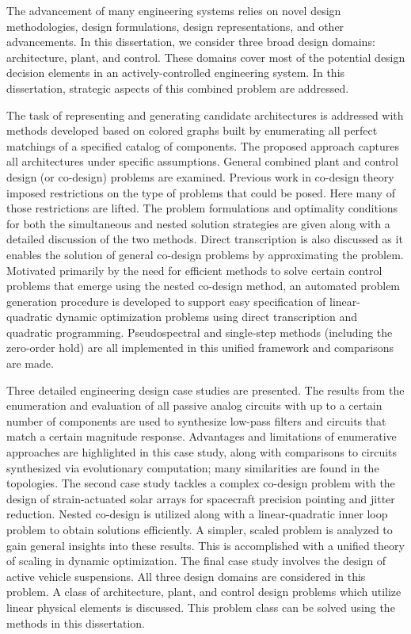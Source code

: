 The advancement of many engineering systems relies on novel design methodologies, design formulations, design representations, and other advancements. In this dissertation, we consider three broad design domains: architecture, plant, and control. These domains cover most of the potential design decision elements in an actively-controlled engineering system. In this dissertation, strategic aspects of this combined problem are addressed.

The task of representing and generating candidate architectures is addressed with methods developed based on colored graphs built by enumerating all perfect matchings of a specified catalog of components. The proposed approach captures all architectures under specific assumptions. General combined plant and control design (or co-design) problems are examined. Previous work in co-design theory imposed restrictions on the type of problems that could be posed. Here many of those restrictions are lifted. The problem formulations and optimality conditions for both the simultaneous and nested solution strategies are given along with a detailed discussion of the two methods. Direct transcription is also discussed as it enables the solution of general co-design problems by approximating the problem. Motivated primarily by the need for efficient methods to solve certain control problems that emerge using the nested co-design method, an automated problem generation procedure is developed to support easy specification of linear-quadratic dynamic optimization problems using direct transcription and quadratic programming. Pseudospectral and single-step methods (including the zero-order hold) are all implemented in this unified framework and comparisons are made.

Three detailed engineering design case studies are presented. The results from the enumeration and evaluation of all passive analog circuits with up to a certain number of components are used to synthesize low-pass filters and circuits that match a certain magnitude response. Advantages and limitations of enumerative approaches are highlighted in this case study, along with comparisons to circuits synthesized via evolutionary computation; many similarities are found in the topologies. The second case study tackles a complex co-design problem with the design of strain-actuated solar arrays for spacecraft precision pointing and jitter reduction. Nested co-design is utilized along with a linear-quadratic inner loop problem to obtain solutions efficiently. A simpler, scaled problem is analyzed to gain general insights into these results. This is accomplished with a unified theory of scaling in dynamic optimization. The final case study involves the design of active vehicle suspensions. All three design domains are considered in this problem. A class of architecture, plant, and control design problems which utilize linear physical elements is discussed. This problem class can be solved using the methods in this dissertation.